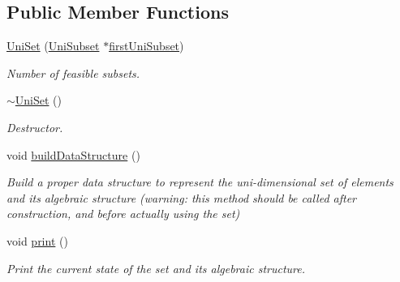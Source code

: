 \subsection*{Public Member Functions}
\begin{DoxyCompactItemize}
\item 
\hyperlink{classUniSet_a7e7a24e0c074fff21442f8ac9c5cd6aa}{Uni\-Set} (\hyperlink{classUniSubset}{Uni\-Subset} $\ast$\hyperlink{classUniSet_a8b2ca464176feddcd8d96c75514eba6b}{first\-Uni\-Subset})
\begin{DoxyCompactList}\small\item\em Number of feasible subsets. \end{DoxyCompactList}\item 
\hypertarget{classUniSet_a702d623676d4b30b832bdf17c1768fbe}{\hyperlink{classUniSet_a702d623676d4b30b832bdf17c1768fbe}{$\sim$\-Uni\-Set} ()}\label{classUniSet_a702d623676d4b30b832bdf17c1768fbe}

\begin{DoxyCompactList}\small\item\em Destructor. \end{DoxyCompactList}\item 
\hypertarget{classUniSet_a0ce5a8030b92cbbf2a810eb03bf65846}{void \hyperlink{classUniSet_a0ce5a8030b92cbbf2a810eb03bf65846}{build\-Data\-Structure} ()}\label{classUniSet_a0ce5a8030b92cbbf2a810eb03bf65846}

\begin{DoxyCompactList}\small\item\em Build a proper data structure to represent the uni-\/dimensional set of elements and its algebraic structure (warning\-: this method should be called after construction, and before actually using the set) \end{DoxyCompactList}\item 
\hypertarget{classUniSet_a6a7601a93553783b443f4b4c65e3b1e8}{void \hyperlink{classUniSet_a6a7601a93553783b443f4b4c65e3b1e8}{print} ()}\label{classUniSet_a6a7601a93553783b443f4b4c65e3b1e8}

\begin{DoxyCompactList}\small\item\em Print the current state of the set and its algebraic structure. \end{DoxyCompactList}\end{DoxyCompactItemize}
